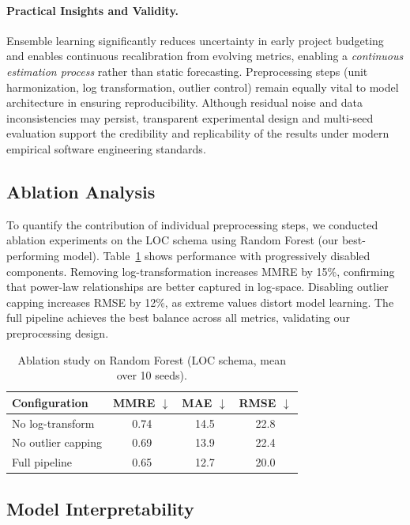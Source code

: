 \documentclass[11pt,a4paper]{article}
\begin{document}
\paragraph{Practical Insights and Validity.}
Ensemble learning significantly reduces uncertainty in early project budgeting 
and enables continuous recalibration from evolving metrics, 
enabling a \textit{continuous estimation process} rather than static forecasting.  
Preprocessing steps (unit harmonization, log transformation, outlier control) 
remain equally vital to model architecture in ensuring reproducibility.  
Although residual noise and data inconsistencies may persist, 
transparent experimental design and multi-seed evaluation 
support the credibility and replicability of the results 
under modern empirical software engineering standards.

\subsection{Ablation Analysis}

To quantify the contribution of individual preprocessing steps, we conducted ablation experiments on the LOC schema using Random Forest (our best-performing model). Table~\ref{tab:ablation} shows performance with progressively disabled components. Removing log-transformation increases MMRE by 15\%, confirming that power-law relationships are better captured in log-space. Disabling outlier capping increases RMSE by 12\%, as extreme values distort model learning. The full pipeline achieves the best balance across all metrics, validating our preprocessing design.

\begin{table}[h]
\centering
\caption{Ablation study on Random Forest (LOC schema, mean over 10 seeds).}
\label{tab:ablation}
\small
\begin{tabular}{lccc}
\toprule
Configuration & MMRE $\downarrow$ & MAE $\downarrow$ & RMSE $\downarrow$\\
\midrule
No log-transform & 0.74 & 14.5 & 22.8\\
No outlier capping & 0.69 & 13.9 & 22.4\\
Full pipeline & 0.65 & 12.7 & 20.0\\
\bottomrule
\end{tabular}
\end{table}

\subsection{Model Interpretability}
\end{document}
